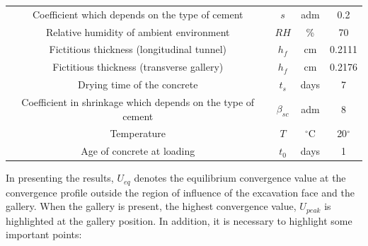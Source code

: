 \documentclass[a4paper,fleqn]{cas-sc}
\begin{document}
\begin{table}
\begin{tabular}{c c c c}
		Coefficient which depends on the type of cement & $s$ & adm & 0.2 \\
		Relative humidity of ambient environment & $RH$ & \% & 70 \\
		Fictitious thickness (longitudinal tunnel) & $h_f$ & cm & 0.2111 \\
		Fictitious thickness (transverse gallery) & $h_f$ & cm & 0.2176 \\
		Drying time of the concrete & $t_s$ & days & 7 \\
		Coefficient in shrinkage which depends on the type of cement & $\beta_{sc}$ & adm & 8 \\
		Temperature & $T$ & $^\circ$C & 20$^\circ$ \\
		Age of concrete at loading & $t_0$ & days & 1 \\
		\hline
	\end{tabular}
	\normalsize
\end{table}
\FloatBarrier
In presenting the results, $U_{eq}$ denotes the equilibrium convergence value at the convergence profile outside the region of influence of the excavation face and the gallery. When the gallery is present, the highest convergence value, $U_{peak}$ is highlighted at the gallery position. In addition, it is necessary to highlight some important points:
\end{document}
